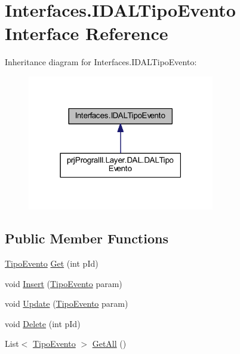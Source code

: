 \hypertarget{interface_interfaces_1_1_i_d_a_l_tipo_evento}{}\section{Interfaces.\+I\+D\+A\+L\+Tipo\+Evento Interface Reference}
\label{interface_interfaces_1_1_i_d_a_l_tipo_evento}


Inheritance diagram for Interfaces.\+I\+D\+A\+L\+Tipo\+Evento\+:
\nopagebreak
\begin{figure}[H]
\begin{center}
\leavevmode
\includegraphics[width=231pt]{interface_interfaces_1_1_i_d_a_l_tipo_evento__inherit__graph}
\end{center}
\end{figure}
\subsection*{Public Member Functions}
\begin{DoxyCompactItemize}
\item 
\hyperlink{classprj_progra_i_i_i_1_1_layer_1_1_entities_1_1_tipo_evento}{Tipo\+Evento} \hyperlink{interface_interfaces_1_1_i_d_a_l_tipo_evento_a28e0e3a7b6e9c4f4a04b787905d7270e}{Get} (int p\+Id)
\item 
void \hyperlink{interface_interfaces_1_1_i_d_a_l_tipo_evento_ac9cd8048199f2db94302ae677629a531}{Insert} (\hyperlink{classprj_progra_i_i_i_1_1_layer_1_1_entities_1_1_tipo_evento}{Tipo\+Evento} param)
\item 
void \hyperlink{interface_interfaces_1_1_i_d_a_l_tipo_evento_a2aec87a149b0edd203803576be6946d0}{Update} (\hyperlink{classprj_progra_i_i_i_1_1_layer_1_1_entities_1_1_tipo_evento}{Tipo\+Evento} param)
\item 
void \hyperlink{interface_interfaces_1_1_i_d_a_l_tipo_evento_acf0a5891c0e73d557860b54f91e329a2}{Delete} (int p\+Id)
\item 
List$<$ \hyperlink{classprj_progra_i_i_i_1_1_layer_1_1_entities_1_1_tipo_evento}{Tipo\+Evento} $>$ \hyperlink{interface_interfaces_1_1_i_d_a_l_tipo_evento_a8e2c880d0b06a4ed517fddda2fba826b}{Get\+All} ()
\end{DoxyCompactItemize}


